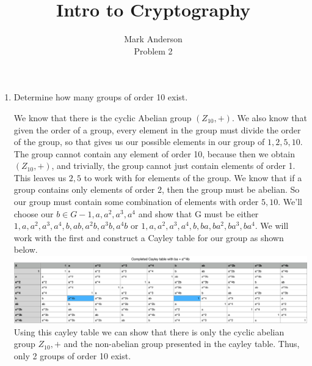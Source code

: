\documentclass[12pt]{article}
\begin{document}
 
\title{Intro to Cryptography} 
\author{Mark Anderson\\ 
Problem 2} 
 
\maketitle
\begin{enumerate}
  \item Determine how many groups of order 10 exist.
  \par
    We know that there is the cyclic Abelian group $ (Z_{10},+) $.  We also know that given the order of a group, every element in the group must divide the order of the group, so that gives us our possible elements in our group of $ {1,2,5,10} $.  The group cannot contain any element of order 10, because then we obtain $ (Z_{10}, +) $, and trivially, the group cannot just contain elements of order 1.  This leaves us ${2,5}$ to work with for elements of the group.  We know that if a group contains only elements of order 2, then the group must be abelian.  So our group must contain some combination of elements with order ${5,10}$.  We'll choose our $ b \in G - {1,a,a^2,a^3,a^4}$ and show that G must be either ${1, a, a^2, a^3, a^4, b, ab, a^2b, a^3b, a^4b}$ or ${1, a, a^2, a^3, a^4, b, ba, ba^2, ba^3, ba^4}$.  We will work with the first and construct a Cayley table for our group as shown below.
  \includegraphics[width=\textwidth,height=2.5\textheight,keepaspectratio]{cayley.png}
  Using this cayley table we can show that there is only the cyclic abelian group $ {Z_{10}, +} $ and the non-abelian group presented in the cayley table.  Thus, only 2 groups of order 10 exist.
\end{enumerate}
\end{document}
